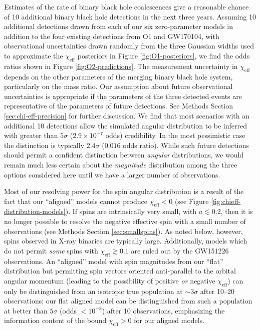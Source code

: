 \documentclass{nature-arxiv}
\newcommand{\chieff}{\chi_\mathrm{eff}}
\newcommand{\OTwoSigmaIsoAlignedMin}{2.4}
\newcommand{\OTwoOddsIsoAlignedMin}{0.016}
\begin{document}
Estimates of the rate of binary black hole coalescences give a
reasonable chance of 10 additional binary black hole detections in the
next three years\cite{O1-BBH,2016ApJ...833L...1A}.  Assuming 10
additional detections drawn from each of our six zero-parameter models
in addition to the four existing detections from O1 and GW170104, with
observational uncertainties drawn randomly from the three Gaussian
widths used to approximate the $\chieff$ posteriors in Figure
\ref{fig:O1-posteriors}, we find the odds ratios shown in Figure
\ref{fig:O2-predictions}.  The measurement uncertainty in $\chieff$
depends on the other parameters of the merging binary black hole
system, particularly on the mass ratio.  Our assumption about future
observational uncertainties is appropriate if the parameters of the
three detected events are representative of the parameters of future
detections. See Methods Section \ref{sec:chi-eff-precision} for
further discussion.  We find that most scenarios with an additional 10
detections allow the simulated angular distribution to be inferred
with greater than $5\sigma$ ($2.9 \times 10^{-7}$ odds)
credibility. In the most pessimistic case the distinction is typically
$\OTwoSigmaIsoAlignedMin\sigma$ ($\OTwoOddsIsoAlignedMin$ odds ratio).
While such future detections should permit a confident distinction
between \emph{angular} distributions, we would remain much less
certain about the \emph{magnitude} distribution among the three
options considered here until we have a larger number of observations.

Most of our resolving power for the spin angular distribution is a
result of the fact that our ``aligned'' models cannot produce
$\chieff < 0$ (see Figure \ref{fig:chieff-distribution-models}).  If
spins are intrinsically very small, with $a \lesssim 0.2$, then it is
no longer possible to resolve the negative effective spin with a small
number of observations (see Methods Section \ref{sec:smallspins}).  As
noted below, however, spins observed in X-ray binaries are typically
large.  Additionally, models which do not permit \emph{some} spins
with $\chieff \gtrsim 0.1$ are ruled out by the GW151226
observations\cite{2016PhRvL.116x1103A}.  An ``aligned'' model with
spin magnitudes from our ``flat'' distribution but permitting spin
vectors oriented anti-parallel to the orbital angular momentum
(leading to the possibility of positive \emph{or} negative $\chieff$)
can only be distinguished from an isotropic true population at
$\sim 3 \sigma$ after 10--20 observations\cite{2017CQGra..34cLT01V};
our flat aligned model can be distinguished from such a population at
better than $5\sigma$ (odds $< 10^{-8}$) after 10 observations,
emphasizing the information content of the bound $\chieff > 0$ for our
aligned models.
\end{document}
